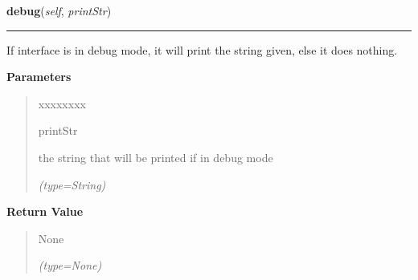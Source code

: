 \hspace{.8\funcindent}\begin{boxedminipage}{\funcwidth}

    \raggedright \textbf{debug}(\textit{self}, \textit{printStr})

    \vspace{-1.5ex}

    \rule{\textwidth}{0.5\fboxrule}
\setlength{\parskip}{2ex}
    If interface is in debug mode, it will print the string given, else it 
    does nothing.

\setlength{\parskip}{1ex}
      \textbf{Parameters}
      \vspace{-1ex}

      \begin{quote}
        \begin{Ventry}{xxxxxxxx}

          \item[printStr]

          the string that will be printed if in debug mode

            {\it (type=String)}

        \end{Ventry}

      \end{quote}

      \textbf{Return Value}
    \vspace{-1ex}

      \begin{quote}
      None

      {\it (type=None)}

      \end{quote}

    \end{boxedminipage}

    \label{client_rest:ImagingInterface:getRawImage}

    \vspace{0.5ex}

